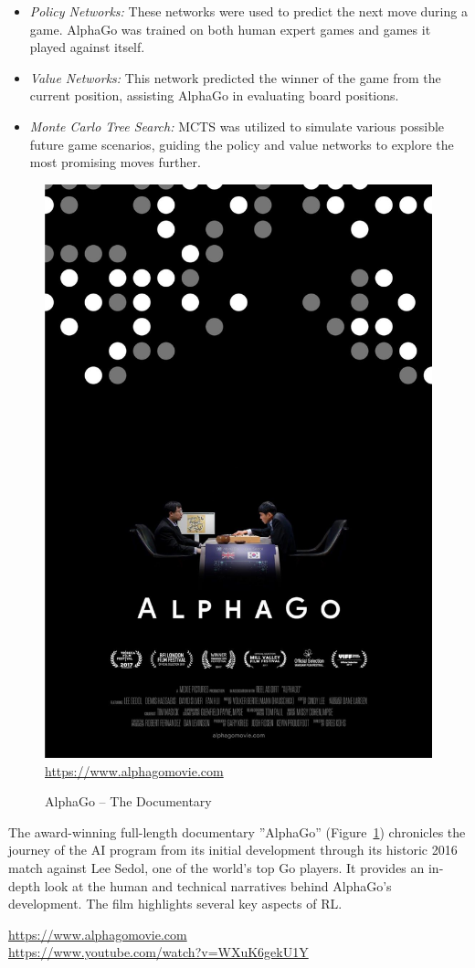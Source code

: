 \begin{itemize}
\item \emph{Policy Networks:} These networks were used to predict the next move during a game. AlphaGo was trained on both human expert games and games it played against itself.
\item \emph{Value Networks:} This network predicted the winner of the game from the current position, assisting AlphaGo in evaluating board positions.
\item \emph{Monte Carlo Tree Search:} MCTS was utilized to simulate various possible future game scenarios, guiding the policy and value networks to explore the most promising moves further.
\end{itemize}

\begin{figure}
\begin{center}
\includegraphics[width=.5\textwidth]{screen2} \\
\footnotesize \url{https://www.alphagomovie.com}
\end{center}
\caption{AlphaGo -- The Documentary}
\label{fig:alphago}
\end{figure}

The award-winning full-length documentary ''AlphaGo'' (Figure~\ref{fig:alphago}) chronicles the journey of the AI program from its initial development through its historic 2016 match against Lee Sedol, one of the world's top Go players. It provides an in-depth look at the human and technical narratives behind AlphaGo's development. The film highlights several key aspects of RL.

\begin{tcolorbox}[colback=code]
\small
\url{https://www.alphagomovie.com} \\

\url{https://www.youtube.com/watch?v=WXuK6gekU1Y}
\normalsize
\end{tcolorbox}

